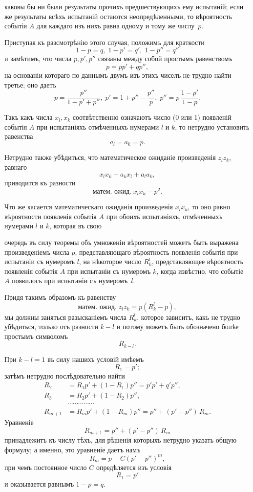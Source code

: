 \documentclass[12pt]{article}
\begin{document}

\noindent каковы бы ни были результаты прочихъ предшествующихъ ему испытаній; если же результаты всѣхъ испытаній остаются неопредѣленными, то вѣроятность событія $A$ для каждаго изъ нихъ равна одному и тому же числу~$p$.

Приступая къ разсмотрѣнію этого случая, положимъ для краткости
\[
1 - p = q,\; 1 - p' = q',\; 1 - p'' = q''
\]
и замѣтимъ, что числа $p, p', p''$ связаны между собой простымъ равенствомъ
\[
p = pp' + qp'',
\]
на основаніи котораго по даннымъ двумъ изъ этихъ чиселъ не трудно найти третье; оно даетъ
\[
p = \frac{p''}{1 - p' + p''},\; p' = 1 + p'' - \frac{p''}{p},\; p'' = p\,\frac{1 - p'}{1 - p}.
\]

Такъ какъ числа $x_l, x_k$ соотвѣтственно означаютъ число (0 или 1) появленій событія $A$ при испытаніяхъ отмѣченныхъ нумерами $l$ и $k$, то нетрудно установить равенства
\[
a_l = a_k = p.
\]

Нетрудно также убѣдиться, что математическое ожиданіе произведенія $z_l z_k$, равнаго
\[
x_l x_k - a_k x_l + a_l a_k,
\]
приводится къ разности
\[
\text{матем.~ожид.}\; x_l x_k - p^2.
\]

Что же касается математическаго ожиданія произведенія $x_l x_k$, то оно равно вѣроятности появленія событія $A$ при обоихъ испытаніяхъ, отмѣченныхъ нумерами $l$ и $k$, которая въ свою


\noindent очередь въ силу теоремы объ умноженіи вѣроятностей можетъ быть выражена произведеніемъ числа $p$, представляющаго вѣроятность появленія событія при испытаніи съ нумеромъ $l$, на нѣкоторое число $R^l_k$, представляющее вѣроятность появленія событія $A$ при испытаніи съ нумеромъ $k$, когда извѣстно, что событіе $A$ появилось при испытаніи съ нумеромъ~$l$.

Придя такимъ образомъ къ равенству
\[
\text{матем.~ожид.}\; z_l z_k = p(R^l_k - p),
\]
мы должны заняться разысканіемъ числа $R^l_k$, которое зависитъ, какъ не трудно убѣдиться, только отъ разности $k - l$ и потому можетъ быть обозначено болѣе простымъ символомъ
\[
R_{k-l}.
\]

При $k - l = 1$ въ силу нашихъ условій имѣемъ
\[
R_1 = p';
\]
затѣмъ нетрудно послѣдовательно найти
\begin{align*}
R_2 &= R_1 p' + (1 - R_1) p'' = p'p' + q'p'', \\
R_3 &= R_2 p' + (1 - R_2) p'', \\
&\cdots\cdots\cdots\cdots\cdots \\
R_{m+1} &= R_m p' + (1 - R_m) p'' = p'' + (p' - p'')\, R_m.
\end{align*}
Уравненіе
\[
R_{m+1} = p'' + (p' - p'')\, R_m
\]
принадлежитъ къ числу тѣхъ, для рѣшенія которыхъ нетрудно указать общую формулу; а именно, это уравненіе даетъ намъ
\[
R_m = p + C(p' - p'')^m,
\]
при чемъ постоянное число $C$ опредѣляется изъ условія
\[
R_1 = p'
\]
и оказывается равнымъ $1 - p = q$.
\end{document}

